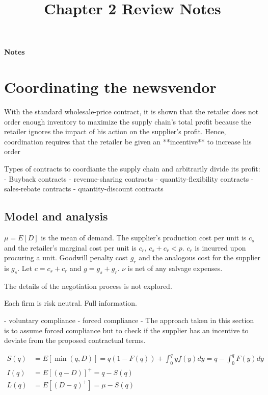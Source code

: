 \setcounter{section}{1}

\title{Chapter 2 Review Notes}

\thispagestyle{empty}

\begin{center}
{\LARGE \bf Notes}\\
\end{center}


\section{Coordinating the newsvendor}

With the standard wholesale-price contract, it is shown that the retailer does not order enough inventory to maximize the supply chain’s total profit because the retailer ignores the impact of his action on the supplier’s profit. Hence, coordination requires that the retailer be given an **incentive** to increase his order

Types of contracts to coordiante the supply chain and arbitrarily divide its profit:
- Buyback contracts
- revenue-sharing contracts
- quantity-flexibility contracts 
- sales-rebate contracts
- quantity-discount contracts


\subsection{Model and analysis}
$\mu=E[D]$ is the mean of demand. The supplier's production cost per unit is $c_s$ and the retailer's marginal cost per unit is $c_r$, $c_s+c_r<p$. $c_r$ is incurred upon procuring a unit. Goodwill penalty cost $g_r$ and the analogous cost for the supplier is $g_s$. Let $c=c_s+c_r$ and $g=g_s+g_r$. $\nu$ is net of any salvage expenses. 

The details of the negotiation process is not explored.

Each firm is risk neutral. Full information.

- voluntary compliance
- forced compliance
- The approach taken in this section is to assume forced compliance but to check if the supplier has an incentive to deviate from the proposed contractual terms.


\begin{align*}
    S(q)&=E[\min(q,D)]=q(1-F(q))+\int_0^q y f(y)dy=q-\int_0^q F(y)dy\\
    I(q)&=E[(q-D)]^+=q-S(q)\\
    L(q)&=E[(D-q)^+]=\mu-S(q)
\end{align*}

